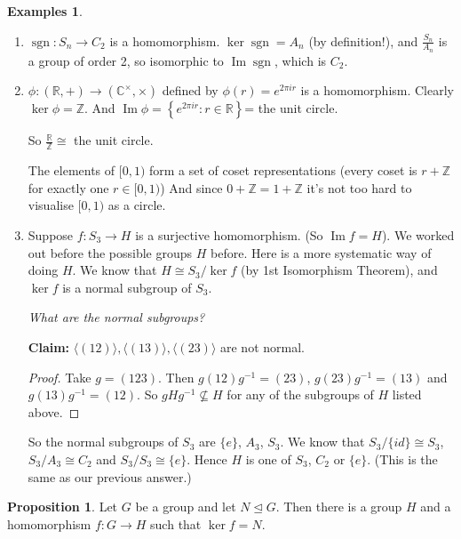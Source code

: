\documentclass{article}
\theoremstyle{definition}
\newtheorem{proposition}[theorem]{Proposition}
\newtheorem*{exmps}{Examples}
\newcommand{\gene}[1]{\langle #1 \rangle}
\newcommand{\func}[3]{#1 : #2 \rightarrow #3}
\newcommand{\integers}{\mathbb{Z}}
\newcommand{\reals}{\mathbb{R}}
\newcommand{\complexes}{\mathbb{C}}
\newcommand{\ism}{\cong}
\DeclareMathOperator{\sgn}{sgn}
\DeclareMathOperator{\Ima}{Im}
\begin{document}
\begin{exmps}\hfill
  \begin{enumerate}
    \item $\func{\sgn}{S_n}{C_2}$ is a homomorphism.
      $\ker \sgn = A_n$ (by definition!), and $\frac{S_n}{A_n}$ is a group of order 2, so isomorphic to $\Ima \sgn$, which is $C_2$.
    \item $\func{\phi}{(\reals,+)}{(\complexes^\times,\times)}$ defined by $\phi(r)=e^{2\pi i r}$ is a homomorphism.
      Clearly $\ker \phi = \integers$.
      And $\Ima \phi = \left\{ e^{2\pi i r} : r \in \reals \right\}$= the unit circle.

      So $\frac{\reals}{\integers}\ism$ the unit circle.


      The elements of $[0,1)$ form a set of coset representations (every coset is $r+\integers$ for exactly one $r \in [0,1)$) And since $0+\integers = 1+\integers$ it's not too hard to visualise $[0,1)$ as a circle.

      \item Suppose $f:S_3 \rightarrow H$ is a surjective homomorphism. (So $\Ima f = H$). We worked out before the possible groups $H$ before. Here is a more systematic way of doing $H$. We know that $H \ism S_3/\ker f$ (by 1st Isomorphism Theorem), and $\ker f$ is a normal subgroup of $S_3$.

        \emph{What are the normal subgroups?}

        \textbf{Claim:} $\gene{(12)},\gene{(13)}, \gene{(23)}$ are not normal.

        \begin{proof}
          Take $g=(123)$. Then $g(12)g^{-1}=(23)$, $g(23)g^{-1}=(13)$ and $g(13)g^{-1}=(12)$. So $gHg^{-1} \not\subseteq H$ for any of the subgroups of $H$ listed above.
        \end{proof}
          So the normal subgroups of $S_3$ are $\{e\}$, $A_3$, $S_3$. We know that $S_3/\{id\} \ism S_3$, $S_3/A_3 \ism C_2$ and $S_3/S_3 \ism \{e\}$. Hence $H$ is one of $S_3$, $C_2$ or $\{e\}$. (This is the same as our previous answer.)\\
  \end{enumerate}
\end{exmps}

  \begin{proposition}
    Let $G$ be a group and let $N \trianglelefteq G$. Then there is a group $H$ and a homomorphism $f : G \rightarrow H$ such that $\ker f = N$.
  \end{proposition}
\end{document}
